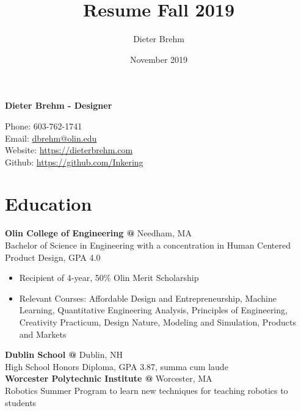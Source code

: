 \documentclass[10pt]{article} %
\title{Resume Fall 2019}
\author{Dieter Brehm}
\date{November 2019}
\begin{document}
{\LARGE\bfseries Dieter Brehm - Designer} %

Phone: 603-762-1741\\ %
Email: \href{mailto:dbrehm@olin.edu}{dbrehm@olin.edu}\\ %
Website: \href{https://dieterbrehm.com}{https://dieterbrehm.com}\\ %
Github: \href{https://github.com/Inkering}{https://github.com/Inkering}\\ %

\begin{minipage}[t]{0.8\textwidth}
\section*{Education}
\textbf{Olin College of Engineering @} \space Needham, MA\\
Bachelor of Science in Engineering with a concentration in Human Centered Product Design, GPA 4.0\\
\begin{itemize} [noitemsep,topsep=0pt]
  \item Recipient of 4-year, 50\% Olin Merit Scholarship
  \item Relevant Courses: Affordable Design and Entrepreneurship, Machine Learning, Quantitative Engineering Analysis, Principles of Engineering, Creativity Practicum, Design Nature, Modeling and Simulation, Products and Markets
  \\
\end{itemize}
\textbf{Dublin School @} \space Dublin, NH\\
High School Honors Diploma, GPA 3.87, summa cum laude\\
\textbf{Worcester Polytechnic Institute @} \space Worcester, MA\\
Robotics Summer Program to learn new techniques for teaching robotics to students


\end{minipage}
\end{document}
